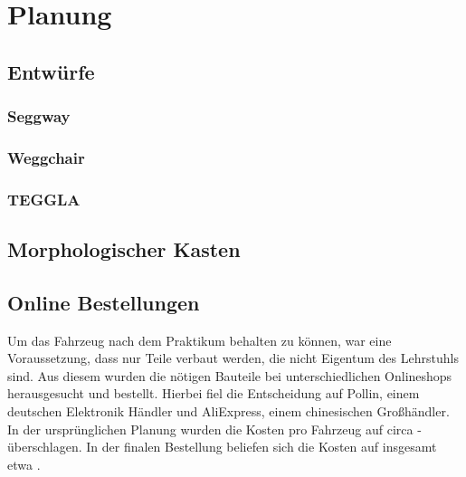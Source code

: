\chapter{Planung}
\section{Entwürfe}
\subsection{Seggway}

\subsection{Weggchair}

\subsection{TEGGLA}

\section{Morphologischer Kasten}

\section{Online Bestellungen}
Um das Fahrzeug nach dem Praktikum behalten zu können, war eine Voraussetzung, dass nur Teile verbaut werden, die nicht Eigentum des Lehrstuhls sind.
Aus diesem wurden die nötigen Bauteile bei unterschiedlichen Onlineshops herausgesucht und bestellt.
Hierbei fiel die Entscheidung auf Pollin, einem deutschen Elektronik Händler und AliExpress, einem chinesischen Großhändler.
In der ursprünglichen Planung wurden die Kosten pro Fahrzeug auf circa  -  überschlagen.
In der finalen Bestellung beliefen sich die Kosten auf insgesamt etwa .

